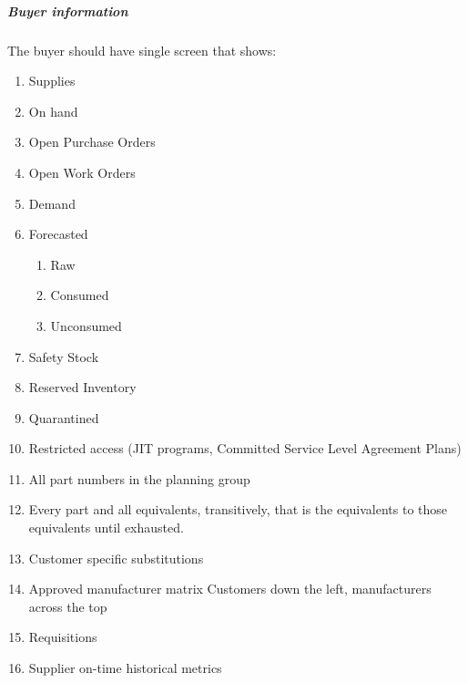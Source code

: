 \documentclass[letterpaper,10pt,english]{sphinxmanual}
\begin{document}
\subparagraph{Buyer information}
\label{\detokenize{FutureState:buyer-information}}
The buyer should have single screen that shows:
\begin{enumerate}
%
\item {} 
Supplies

\item {} 
On hand

\item {} 
Open Purchase Orders

\item {} 
Open Work Orders

\item {} 
Demand

\item {} 
Forecasted
\begin{enumerate}
%
\item {} 
Raw

\item {} 
Consumed

\item {} 
Unconsumed

\end{enumerate}

\item {} 
Safety Stock

\item {} 
Reserved Inventory

\item {} 
Quarantined

\item {} 
Restricted access (JIT programs, Committed Service Level Agreement
Plans)

\item {} 
All part numbers in the planning group

\item {} 
Every part and all equivalents, transitively, that is the equivalents
to those equivalents until exhausted.

\item {} 
Customer specific substitutions

\item {} 
Approved manufacturer matrix Customers down the left, manufacturers
across the top

\item {} 
Requisitions

\item {} 
Supplier on-time historical metrics


\end{enumerate}
\end{document}
